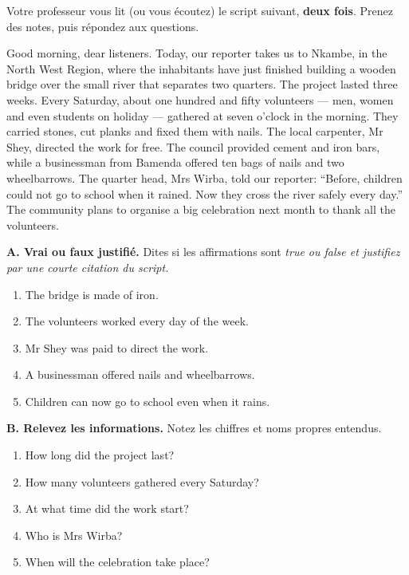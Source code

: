 \documentclass[11pt]{article}
\newcommand{\eng}[1]{\ifmmode\text{\textit{#1}}\else\begingroup\selectlanguage{english}\itshape #1\endgroup\fi}
\begin{document}
\begin{exercice}
Votre professeur vous lit (ou vous écoutez) le script suivant, \textbf{deux fois}. Prenez des notes, puis répondez aux questions.
\begin{textebox}
Good morning, dear listeners. Today, our reporter takes us to Nkambe, in the North West Region, where the inhabitants have just finished building a wooden bridge over the small river that separates two quarters. The project lasted three weeks. Every Saturday, about one hundred and fifty volunteers — men, women and even students on holiday — gathered at seven o'clock in the morning. They carried stones, cut planks and fixed them with nails. The local carpenter, Mr Shey, directed the work for free. The council provided cement and iron bars, while a businessman from Bamenda offered ten bags of nails and two wheelbarrows. The quarter head, Mrs Wirba, told our reporter: “Before, children could not go to school when it rained. Now they cross the river safely every day.” The community plans to organise a big celebration next month to thank all the volunteers.
\end{textebox}
\textbf{A. Vrai ou faux justifié.} Dites si les affirmations sont \eng{true} ou \eng{false} et justifiez par une courte citation du script.
\begin{enumerate}
\item The bridge is made of iron.
\item The volunteers worked every day of the week.
\item Mr Shey was paid to direct the work.
\item A businessman offered nails and wheelbarrows.
\item Children can now go to school even when it rains.
\end{enumerate}
\textbf{B. Relevez les informations.} Notez les chiffres et noms propres entendus.
\begin{enumerate}
\item How long did the project last?
\item How many volunteers gathered every Saturday?
\item At what time did the work start?
\item Who is Mrs Wirba?
\item When will the celebration take place?
\end{enumerate}
\end{exercice}
\end{document}
